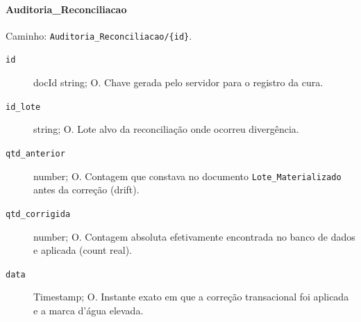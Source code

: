 \paragraph{Auditoria\_Reconciliacao}\mbox{}\par
Caminho: \texttt{Auditoria\_Reconciliacao/\{id\}}.
\begin{description}
\item[\texttt{id}] docId string; O. Chave gerada pelo servidor para o registro da cura.
\item[\texttt{id\_lote}] string; O. Lote alvo da reconciliação onde ocorreu divergência.
\item[\texttt{qtd\_anterior}] number; O. Contagem que constava no documento \texttt{Lote\_Materializado} antes da correção (drift).
\item[\texttt{qtd\_corrigida}] number; O. Contagem absoluta efetivamente encontrada no banco de dados e aplicada (count real).
\item[\texttt{data}] Timestamp; O. Instante exato em que a correção transacional foi aplicada e a marca d'água elevada.
\end{description}

